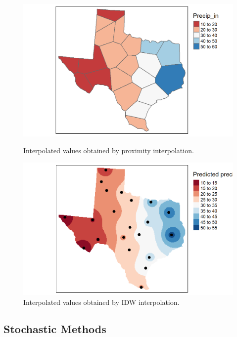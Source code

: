 \begin{figure}[ht!]
    \centering
    \begin{minipage}{0.49\textwidth}
        \centering
        \includegraphics[width=\textwidth]{img/interpolation_proximity.png}
        \caption{Interpolated values obtained by proximity interpolation.}
        \label{fig:interpolation_proximity}
    \end{minipage}
    \hfill
    \begin{minipage}{0.49\textwidth}
        \centering
        \includegraphics[width=\textwidth]{img/interpolation_idw.png}
        \caption{Interpolated values obtained by IDW interpolation.}
        \label{fig:interpolation_idw}
    \end{minipage}
\end{figure}

\subsection{Stochastic Methods}

